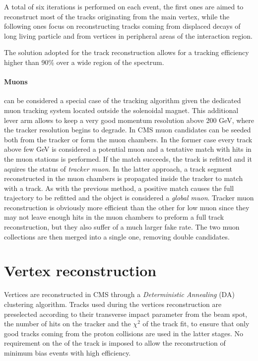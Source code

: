 A total of six iterations is performed on each event, the first ones are aimed to reconstruct most of the tracks originating from the main vertex, while the following ones focus on reconstructing tracks coming from displaced decays of long living particle and from vertices in peripheral areas of the interaction region.

The solution adopted for the track reconstruction allows for a tracking efficiency higher than 90\% over a wide region of the \pT spectrum.

\paragraph{Muons} can be considered a special case of the tracking algorithm given the dedicated muon tracking system located outside the solenoidal magnet. This additional lever arm allows to keep a very good momentum resolution above 200 GeV, where the tracker resolution begins to degrade. In CMS muon candidates can be seeded both from the tracker or form the muon chambers. In the former case every track above few GeV is considered a potential muon and a tentative match with hits in the muon stations is performed. If the match succeeds, the track is refitted and it aquires the status of \emph{tracker muon}. In the latter approach, a track segment reconstructed in the muon chambers is propagated inside the tracker to match with a track. As with the previous method, a positive match causes the full trajectory to be refitted and the object is considered a \emph{global muon}. Tracker muon reconstruction is obviously more efficient than the other for low \pT muon since they may not leave enough hits in the muon chambers to preform a full track reconstruction, but they also suffer of a much larger fake rate. The two muon collections are then merged into a single one, removing double candidates.

\section{Vertex reconstruction}

Vertices are reconstructed in CMS through a \emph{Deterministic Annealing} (DA) \cite{IEEE_DetAnnealing} clustering algorithm. Tracks used during the vertices reconstruction are preselected according to their transverse impact parameter from the beam spot, the number of hits on the tracker and the $\chi^2$ of the track fit, to ensure that only good tracks coming from the proton collisions are used in the latter stages. No requirement on the \pT of the track is imposed to allow the reconstruction of minimum bias events with high efficiency.

